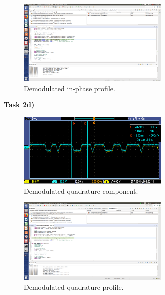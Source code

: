 \documentclass{article}
\begin{document}
\begin{figure}[h]
  \begin{center}
    \includegraphics[width=0.65\textwidth]{img/task_2_c_profile.png}
    \caption{Demodulated in-phase profile.}
  \end{center}
\end{figure}

\pagebreak
\textbf{Task 2d)}

\begin{figure}[h]
  \begin{center}
    \includegraphics[width=0.65\textwidth]{img/task_2_c_oscilloscope.png}
    \caption{Demodulated quadrature component.}
  \end{center}
\end{figure}

\begin{figure}[h]
  \begin{center}
    \includegraphics[width=0.65\textwidth]{img/task_2_c_profile.png}
    \caption{Demodulated quadrature profile.}
  \end{center}
\end{figure}
\end{document}
